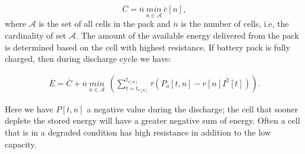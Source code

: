 \documentclass[10pt,twocolumn]{IEEEtran}
\begin{document}
\begin{equation}
\overline{C}=\overline{n} \ \underset{n\in \mathcal{A}}{min} \ \overline{c}[n] ,
\label{eq:lhscap}
\end{equation}
\noindent where $\mathcal{A}$ is the set of all cells in the pack and $\overline{n}$ is the number of cells, i.e, the cardinality of set $\mathcal{A}$. 
The amount of the available energy delivered from the pack is determined based on the cell with highest resistance. 
If battery pack is fully charged, then during discharge cycle we have:

\begin{equation}
\begin{split}
\overline{E} = \overline{C} +  \overline{n} \ \underset{n\in \mathcal{A}}{min} \ \ 
\left(   \sum_{t=t_{\overline{c}[n]}}^{   t_{\underline{c}[n]}}  \tau(P_{o}[t,n] - r[n]I^2[t]) \right).
\end{split}
\label{available_energy}
\end{equation}

\noindent Here  we have $P[t,n]$ a negative value during the discharge; the cell that sooner deplete the stored energy will have a greater negative sum of energy.
Often a cell that is in a degraded condition has  high resistance in addition to the low capacity. %
\end{document}
